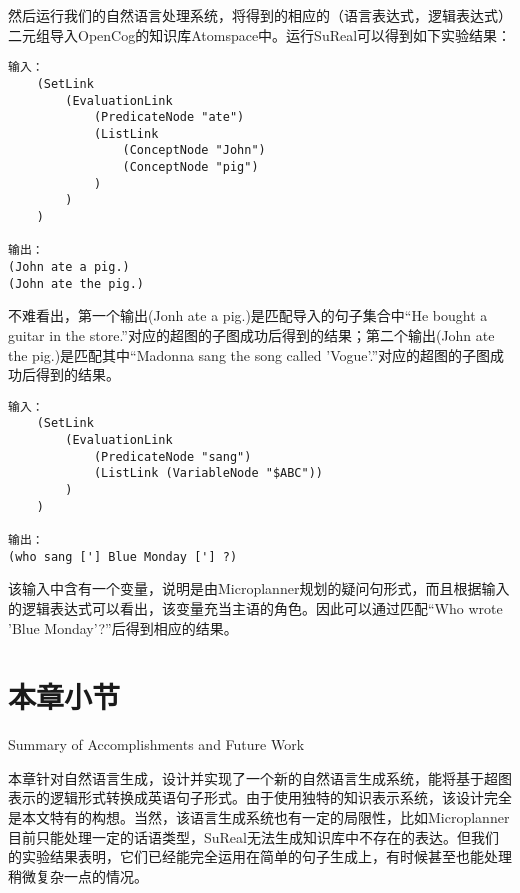 然后运行我们的自然语言处理系统，将得到的相应的（语言表达式，逻辑表达式）二元组导入OpenCog的知识库Atomspace中。运行SuReal可以得到如下实验结果：

\begin{verbatim}
输入：
    (SetLink
        (EvaluationLink
            (PredicateNode "ate")
            (ListLink
                (ConceptNode "John")
                (ConceptNode "pig")
            )
        )
    )

输出：
(John ate a pig.)
(John ate the pig.)

\end{verbatim}

不难看出，第一个输出(Jonh ate a pig.)是匹配导入的句子集合中“He bought a guitar in the store.”对应的超图的子图成功后得到的结果；第二个输出(John ate the pig.)是匹配其中“Madonna sang the song called 'Vogue'.”对应的超图的子图成功后得到的结果。

\begin{verbatim}
输入：
    (SetLink
        (EvaluationLink
            (PredicateNode "sang")
            (ListLink (VariableNode "$ABC"))
        )
    )

输出：
(who sang ['] Blue Monday ['] ?)

\end{verbatim}

该输入中含有一个变量，说明是由Microplanner规划的疑问句形式，而且根据输入的逻辑表达式可以看出，该变量充当主语的角色。因此可以通过匹配“Who wrote 'Blue Monday'?”后得到相应的结果。

\section{本章小节}{Summary of Accomplishments and Future Work}

本章针对自然语言生成，设计并实现了一个新的自然语言生成系统，能将基于超图表示的逻辑形式转换成英语句子形式。由于使用独特的知识表示系统，该设计完全是本文特有的构想。当然，该语言生成系统也有一定的局限性，比如Microplanner目前只能处理一定的话语类型，SuReal无法生成知识库中不存在的表达。但我们的实验结果表明，它们已经能完全运用在简单的句子生成上，有时候甚至也能处理稍微复杂一点的情况。